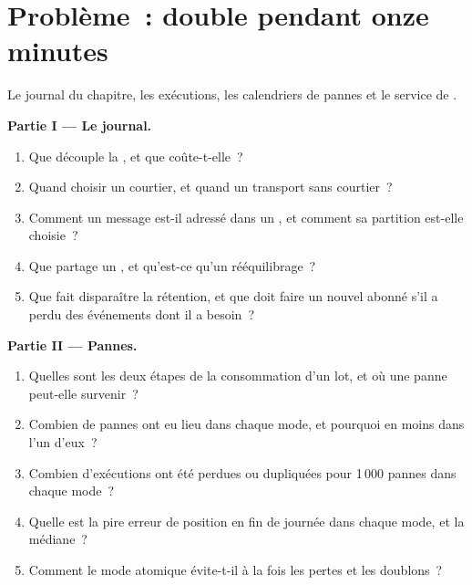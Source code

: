 \section{Problème~: double pendant onze minutes}

\begin{problem}\label{pb:pl:messaging-and-event-driven-architecture:1}
Le journal du chapitre, les exécutions, les calendriers de pannes et le service de .

\medskip\noindent\textbf{Partie I --- Le journal.}
\begin{enumerate}
\item Que découple la , et que coûte-t-elle~?
\item Quand choisir un courtier, et quand un transport sans courtier~?
\item Comment un message est-il adressé dans un , et comment sa partition est-elle choisie~?
\item Que partage un , et qu'est-ce qu'un rééquilibrage~?
\item Que fait disparaître la rétention, et que doit faire un nouvel abonné s'il a perdu des événements dont il a besoin~?
\end{enumerate}

\medskip\noindent\textbf{Partie II --- Pannes.}
\begin{enumerate}[resume]
\item Quelles sont les deux étapes de la consommation d'un lot, et où une panne peut-elle survenir~?
\item Combien de pannes ont eu lieu dans chaque mode, et pourquoi en moins dans l'un d'eux~?
\item Combien d'exécutions ont été perdues ou dupliquées pour 1\,000 pannes dans chaque mode~?
\item Quelle est la pire erreur de position en fin de journée dans chaque mode, et la médiane~?
\item Comment le mode atomique évite-t-il à la fois les pertes et les doublons~?
\end{enumerate}


\end{problem}
